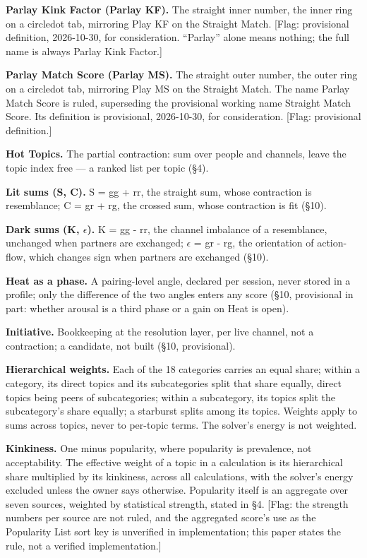 \textbf{Parlay Kink Factor (Parlay KF).} The straight inner number, the
inner ring on a circledot tab, mirroring Play KF on the Straight Match.
{[}Flag: provisional definition, 2026-10-30, for consideration.
``Parlay'' alone means nothing; the full name is always Parlay Kink
Factor.{]}

\textbf{Parlay Match Score (Parlay MS).} The straight outer number, the
outer ring on a circledot tab, mirroring Play MS on the Straight Match.
The name Parlay Match Score is ruled, superseding the provisional
working name Straight Match Score. Its definition is provisional,
2026-10-30, for consideration. {[}Flag: provisional definition.{]}

\textbf{Hot Topics.} The partial contraction: sum over people and
channels, leave the topic index free --- a ranked list per topic (\S 4).

\textbf{Lit sums (S, C).} S = gg + rr, the straight sum, whose
contraction is resemblance; C = gr + rg, the crossed sum, whose
contraction is fit (\S 10).

\textbf{Dark sums (K, $\epsilon$).} K = gg - rr, the channel imbalance of a
resemblance, unchanged when partners are exchanged; $\epsilon$ = gr - rg, the
orientation of action-flow, which changes sign when partners are
exchanged (\S 10).

\textbf{Heat as a phase.} A pairing-level angle, declared per session,
never stored in a profile; only the difference of the two angles enters
any score (\S 10, provisional in part: whether arousal is a third phase or
a gain on Heat is open).

\textbf{Initiative.} Bookkeeping at the resolution layer, per live
channel, not a contraction; a candidate, not built (\S 10, provisional).

\textbf{Hierarchical weights.} Each of the 18 categories carries an
equal share; within a category, its direct topics and its subcategories
split that share equally, direct topics being peers of subcategories;
within a subcategory, its topics split the subcategory's share equally;
a starburst splits among its topics. Weights apply to sums across
topics, never to per-topic terms. The solver's energy is not weighted.

\textbf{Kinkiness.} One minus popularity, where popularity is
prevalence, not acceptability. The effective weight of a topic in a
calculation is its hierarchical share multiplied by its kinkiness,
across all calculations, with the solver's energy excluded unless the
owner says otherwise. Popularity itself is an aggregate over seven
sources, weighted by statistical strength, stated in \S 4. {[}Flag: the
strength numbers per source are not ruled, and the aggregated score's
use as the Popularity List sort key is unverified in implementation;
this paper states the rule, not a verified implementation.{]}


